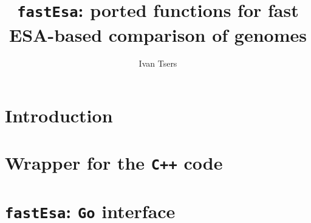 \documentclass[a4paper]{article}
\begin{document}
\pagestyle{noweb}

\title{\texttt{fastEsa}: ported functions for fast ESA-based comparison of genomes}
\author{Ivan Tsers}
\date{}
\maketitle

\tableofcontents

\section{Introduction}

\newpage
\section{Wrapper for the \texttt{C++} code}

\newpage
\section{\texttt{fastEsa}: \texttt{Go} interface}

\newpage
%


\end{document}
